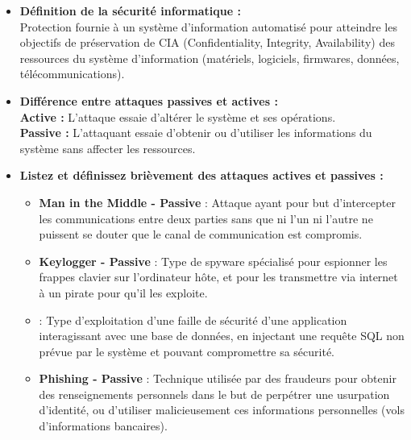 \documentclass{report}
\begin{document}
			\begin{itemize}

				\item \textbf{Définition de la sécurité informatique : } \\

				Protection fournie à un système d'information automatisé pour atteindre les objectifs de préservation de CIA (Confidentiality, Integrity, Availability) des ressources du système d'information (matériels, logiciels, firmwares, données, télécommunications).\\

				\item \textbf{Différence entre attaques passives et actives : }\\

				\textbf{Active : } L'attaque essaie d'altérer le système et ses opérations.\\
				\textbf{Passive :} L'attaquant essaie d'obtenir ou d'utiliser les informations du système sans affecter les ressources.\\

				\item \textbf{Listez et définissez brièvement des attaques actives et passives :}\\

					\begin{itemize}

						\item \textbf{Man in the Middle - Passive} : Attaque ayant pour but d'intercepter les communications entre deux parties sans que ni l'un ni l'autre ne puissent se douter que le canal de communication est compromis.\\

						\item \textbf{Keylogger - Passive} : Type de spyware spécialisé pour espionner les frappes clavier sur l'ordinateur hôte, et pour les transmettre via internet à un pirate pour qu'il les exploite.\\

						\item {} : Type d'exploitation d'une faille de sécurité d'une application interagissant avec une base de données, en injectant une requête SQL non prévue par le système et pouvant compromettre sa sécurité.\\

						\item \textbf{Phishing - Passive} : Technique utilisée par des fraudeurs pour obtenir des renseignements personnels dans le but de perpétrer une usurpation d'identité, ou d'utiliser malicieusement ces informations personnelles (vols d'informations bancaires).\\


\end{itemize}
\end{itemize}
\end{document}
